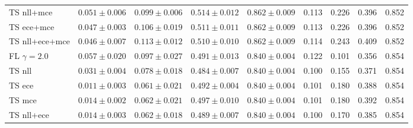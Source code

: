 \begin{table}[h!]
{\begin{tabular}{l|cccc|m{0.8cm}m{0.8cm}m{0.8cm}m{0.8cm}|}
			TS nll+mce & \multicolumn{1}{c|}{$0.051 \pm 0.006$} & \multicolumn{1}{c|}{$0.099 \pm 0.006$} & \multicolumn{1}{c|}{$0.514 \pm 0.012$} & \multicolumn{1}{c|}{$0.862 \pm 0.009$} & \multicolumn{1}{c|}{0.113} & \multicolumn{1}{c|}{0.226} & \multicolumn{1}{c|}{0.396} & \multicolumn{1}{c|}{0.852} \\
			TS ece+mce & \multicolumn{1}{c|}{$0.047 \pm 0.003$} & \multicolumn{1}{c|}{$0.106 \pm 0.019$} & \multicolumn{1}{c|}{$0.511 \pm 0.011$} & \multicolumn{1}{c|}{$0.862 \pm 0.009$} & \multicolumn{1}{c|}{0.113} & \multicolumn{1}{c|}{0.226} & \multicolumn{1}{c|}{0.396} & \multicolumn{1}{c|}{0.852} \\
			TS nll+ece+mce & \multicolumn{1}{c|}{$0.046 \pm 0.007$} & \multicolumn{1}{c|}{$0.113 \pm 0.012$} & \multicolumn{1}{c|}{$0.510 \pm 0.010$} & \multicolumn{1}{c|}{$0.862 \pm 0.009$} & \multicolumn{1}{c|}{0.114} & \multicolumn{1}{c|}{0.243} & \multicolumn{1}{c|}{0.409} & \multicolumn{1}{c|}{0.852} \\ \hline \hline
			FL $\gamma=2.0$ & \multicolumn{1}{c|}{$0.057 \pm 0.020$}& \multicolumn{1}{c|}{$0.097 \pm 0.027$}& \multicolumn{1}{c|}{$0.491 \pm 0.013$}& \multicolumn{1}{c|}{$0.840 \pm 0.004$}& \multicolumn{1}{c|}{0.122} & \multicolumn{1}{c|}{0.101} & \multicolumn{1}{c|}{0.356} & \multicolumn{1}{c|}{0.854} \\
			TS nll & \multicolumn{1}{c|}{$0.031 \pm 0.004$}& \multicolumn{1}{c|}{$0.078 \pm 0.018$}& \multicolumn{1}{c|}{$0.484 \pm 0.007$}& \multicolumn{1}{c|}{$0.840 \pm 0.004$}& \multicolumn{1}{c|}{0.100} & \multicolumn{1}{c|}{0.155} & \multicolumn{1}{c|}{0.371} & \multicolumn{1}{c|}{0.854} \\
			TS ece & \multicolumn{1}{c|}{$0.011 \pm 0.003$}& \multicolumn{1}{c|}{$0.061 \pm 0.021$}& \multicolumn{1}{c|}{$0.492 \pm 0.004$}& \multicolumn{1}{c|}{$0.840 \pm 0.004$}& \multicolumn{1}{c|}{0.101} & \multicolumn{1}{c|}{0.180} & \multicolumn{1}{c|}{0.388} & \multicolumn{1}{c|}{0.854} \\
			TS mce & \multicolumn{1}{c|}{$0.014 \pm 0.002$}& \multicolumn{1}{c|}{$0.062 \pm 0.021$}& \multicolumn{1}{c|}{$0.497 \pm 0.010$}& \multicolumn{1}{c|}{$0.840 \pm 0.004$}& \multicolumn{1}{c|}{0.101} & \multicolumn{1}{c|}{0.180} & \multicolumn{1}{c|}{0.392} & \multicolumn{1}{c|}{0.854} \\
			TS nll+ece & \multicolumn{1}{c|}{$0.014 \pm 0.003$}& \multicolumn{1}{c|}{$0.062 \pm 0.018$}& \multicolumn{1}{c|}{$0.489 \pm 0.007$}& \multicolumn{1}{c|}{$0.840 \pm 0.004$}& \multicolumn{1}{c|}{0.100} & \multicolumn{1}{c|}{0.170} & \multicolumn{1}{c|}{0.385} & \multicolumn{1}{c|}{0.854} \\

\end{tabular}}
\end{table}

